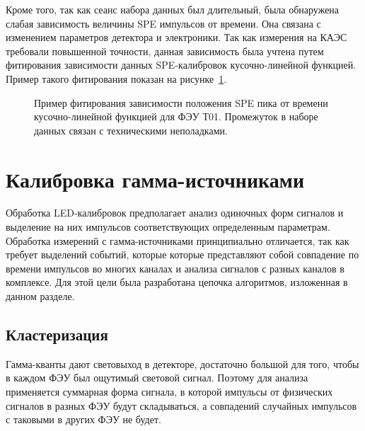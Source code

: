 Кроме того, так как сеанс набора данных был длительный, была обнаружена слабая зависимость величины SPE импульсов от времени. Она связана с изменением параметров детектора и электроники. Так как измерения на КАЭС требовали повышенной точности, данная зависимость была учтена путем фитирования зависимости данных SPE-калибровок кусочно-линейной функцией. Пример такого фитирования показан на рисунке~\ref{img:spevstimefit}.

\begin{figure}[H]
	\caption[Пример фитирования зависимости положения SPE пика от времени для ФЭУ Т01.] {Пример фитирования зависимости положения SPE пика от времени кусочно-линейной функцией для ФЭУ Т01. Промежуток в наборе данных связан с техническими неполадками.}
	\label{img:spevstimefit}
\end{figure}

\section{Калибровка гамма-источниками}
\label{sect3_3}
Обработка LED-калибровок предполагает анализ одиночных форм сигналов и выделение на них импульсов соответствующих определенным параметрам. Обработка измерений с гамма-источниками принципиально отличается, так как требует выделений событий, которые которые представляют собой совпадение по времени импульсов во многих каналах и анализа сигналов с разных каналов в комплексе. Для этой цели была разработана цепочка алгоритмов, изложенная в данном разделе.
\subsection{Кластеризация}
\label{subsect3_3_1}
Гамма-кванты дают световыход в детекторе, достаточно большой для того, чтобы в каждом ФЭУ был ощутимый световой сигнал. Поэтому для анализа применяется суммарная форма сигнала, в которой импульсы от физических сигналов в разных ФЭУ будут складываться, а совпадений случайных импульсов с таковыми в других ФЭУ не будет.


